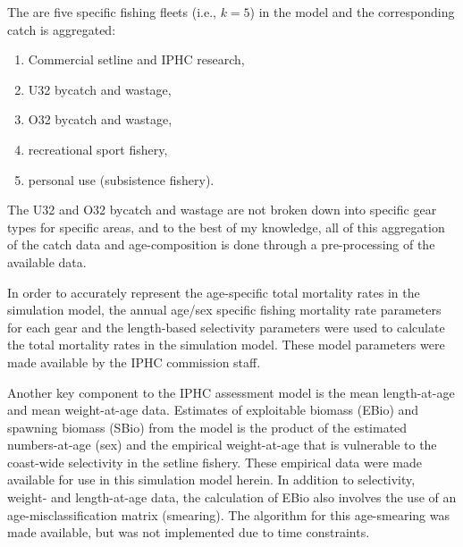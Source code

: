 The are five  specific fishing fleets (i.e., $k=5$) in the model and the corresponding catch is aggregated:
\begin{enumerate}
	\item Commercial setline  and IPHC research,
	\item U32 bycatch and wastage,
	\item O32 bycatch and wastage,
	\item recreational sport fishery,
	\item personal use (subsistence fishery).
\end{enumerate}
The U32 and O32 bycatch and wastage are not broken down into specific gear types for specific areas, and to the best of my knowledge, all of this aggregation of the catch data and age-composition is done through a pre-processing of the available data.

In order to accurately represent the age-specific total mortality rates in the simulation model, the annual age/sex specific fishing mortality rate parameters for each gear and the length-based selectivity parameters were used to calculate the total mortality rates in the simulation model.  These model parameters were made available by the IPHC commission staff.


Another key component to the IPHC assessment model is the mean length-at-age and mean weight-at-age data. Estimates of exploitable biomass (EBio) and spawning biomass (SBio) from the model is the product of the estimated numbers-at-age (sex) and the empirical weight-at-age that is vulnerable to the coast-wide selectivity in the setline fishery.  These empirical data were made available for use in this simulation model herein.  In addition to selectivity, weight- and length-at-age data, the calculation of EBio also involves the use of an age-misclassification matrix (smearing).  The algorithm for this age-smearing was made available, but was not implemented due to time constraints.


